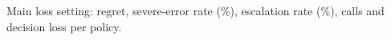 \begin{table}[!htbp]
\centering\scriptsize\setlength{\tabcolsep}{3pt}
\caption{Main loss setting: regret, severe-error rate (\%), escalation rate (\%), calls and decision loss per policy.}
\label{tab:app-metrics}
\resizebox{\linewidth}{!}{}
\end{table}
